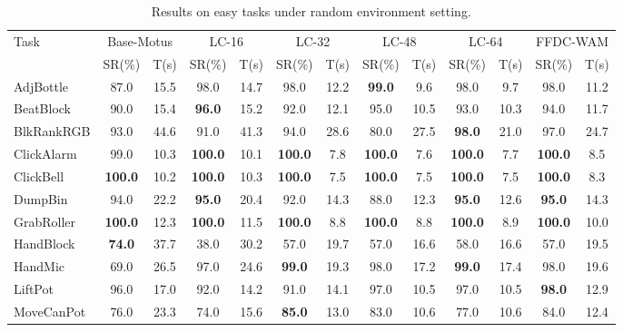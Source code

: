 \documentclass{article}
\begin{document}
\begin{table}[t]
\renewcommand{\arraystretch}{1}
\centering
\setlength{\tabcolsep}{1.5pt}
\caption{Results on easy tasks under random environment setting.}
\label{tab:easy_random_results}
\begin{tabular}{@{}lcccccccccccc@{}}
\toprule
\multirow{2}{*}{Task}
& \multicolumn{2}{c}{Base-Motus}
& \multicolumn{2}{c}{LC-16}
& \multicolumn{2}{c}{LC-32}
& \multicolumn{2}{c}{LC-48}
& \multicolumn{2}{c}{LC-64}
& \multicolumn{2}{c}{FFDC-WAM} \\
\cmidrule(lr){2-3}
\cmidrule(lr){4-5}
\cmidrule(lr){6-7}
\cmidrule(lr){8-9}
\cmidrule(lr){10-11}
\cmidrule(lr){12-13}
& SR(\%) & T(s)
& SR(\%) & T(s)
& SR(\%) & T(s)
& SR(\%) & T(s)
& SR(\%) & T(s)
& SR(\%) & T(s) \\
\midrule
AdjBottle      & 87.0 & 15.5 & 98.0 & 14.7 & 98.0 & 12.2 & \textbf{99.0} & 9.6 & 98.0 & 9.7 & 98.0 & 11.2 \\
BeatBlock      & 90.0 & 15.4 & \textbf{96.0} & 15.2 & 92.0 & 12.1 & 95.0 & 10.5 & 93.0 & 10.3 & 94.0 & 11.7 \\
BlkRankRGB     & 93.0 & 44.6 & 91.0 & 41.3 & 94.0 & 28.6 & 80.0 & 27.5 & \textbf{98.0} & 21.0 & 97.0 & 24.7 \\
ClickAlarm     & 99.0 & 10.3 & \textbf{100.0} & 10.1 & \textbf{100.0} & 7.8 & \textbf{100.0} & 7.6 & \textbf{100.0} & 7.7 & \textbf{100.0} & 8.5 \\
ClickBell      & \textbf{100.0} & 10.2 & \textbf{100.0} & 10.3 & \textbf{100.0} & 7.5 & \textbf{100.0} & 7.5 & \textbf{100.0} & 7.5 & \textbf{100.0} & 8.3 \\
DumpBin        & 94.0 & 22.2 & \textbf{95.0} & 20.4 & 92.0 & 14.3 & 88.0 & 12.3 & \textbf{95.0} & 12.6 & \textbf{95.0} & 14.3 \\
GrabRoller     & \textbf{100.0} & 12.3 & \textbf{100.0} & 11.5 & \textbf{100.0} & 8.8 & \textbf{100.0} & 8.8 & \textbf{100.0} & 8.9 & \textbf{100.0} & 10.0 \\
HandBlock      & \textbf{74.0} & 37.7 & 38.0 & 30.2 & 57.0 & 19.7 & 57.0 & 16.6 & 58.0 & 16.6 & 57.0 & 19.5 \\
HandMic        & 69.0 & 26.5 & 97.0 & 24.6 & \textbf{99.0} & 19.3 & 98.0 & 17.2 & \textbf{99.0} & 17.4 & 98.0 & 19.6 \\
LiftPot        & 96.0 & 17.0 & 92.0 & 14.2 & 91.0 & 14.1 & 97.0 & 10.5 & 97.0 & 10.5 & \textbf{98.0} & 12.9 \\
MoveCanPot     & 76.0 & 23.3 & 74.0 & 15.6 & \textbf{85.0} & 13.0 & 83.0 & 10.6 & 77.0 & 10.6 & 84.0 & 12.4 \\

\end{tabular}
\end{table}
\end{document}
